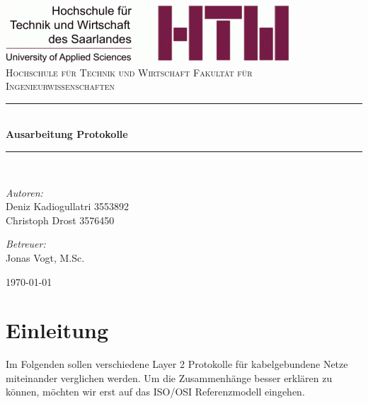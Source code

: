 \documentclass[12pt, a4paper, ngerman]{article}
\newcommand{\osi}{ISO/OSI Referenzmodell\xspace}
\begin{document}
\begin{titlepage}
		\begin{center}
			\includegraphics[width=.8\linewidth]{Grafiken/logo_htw.jpg}\\[1cm]    
			\textsc{\LARGE Hochschule für Technik und Wirtschaft \newline Fakultät für Ingenieurwissenschaften}\\[1.5cm]
			\newcommand{\HRule}{\rule{\linewidth}{0.5mm}} \HRule \\[0.4cm] { \huge \bfseries Ausarbeitung Protokolle}\\[0.4cm]
			\HRule \\[1.5cm]

			\begin{minipage}{0.4\textwidth}
				\begin{flushleft} \large
					\emph{Autoren:}\\
					Deniz Kadiogullatri 3553892\\
					Christoph Drost 3576450
				\end{flushleft}
			\end{minipage}
			\hfill
			\begin{minipage}{0.4\textwidth}
				\begin{flushright} \large
					\emph{Betreuer:} \\
					Jonas Vogt, M.Sc.
				\end{flushright}
			\end{minipage}
			\vfill
			{\large \today}
		\end{center}
	\end{titlepage}


\tableofcontents
\newpage 

\section{Einleitung}
Im Folgenden sollen verschiedene Layer 2 Protokolle für kabelgebundene Netze miteinander verglichen werden. Um die Zusammenhänge besser erklären zu können, möchten wir erst auf das \osi eingehen.
\end{document}
